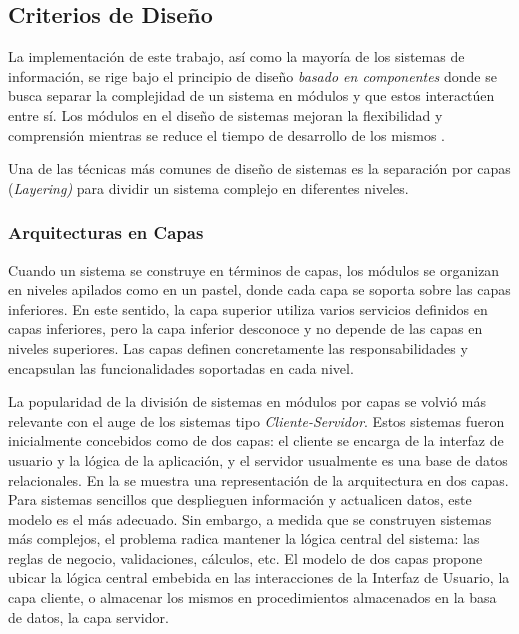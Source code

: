 \subsection{Criterios de Diseño}

\label{ssec52:criterios-dise=0000F1o}La implementación de este trabajo,
así como la mayoría de los sistemas de información, se rige bajo el
principio de diseño \emph{basado en componentes} donde se busca separar
la complejidad de un sistema en módulos y que estos interactúen entre
sí. Los módulos en el diseño de sistemas mejoran la flexibilidad y
comprensión mientras se reduce el tiempo de desarrollo de los mismos
\cite{Parnas1972}.

Una de las técnicas más comunes de diseño de sistemas\emph{ }es la
separación por capas (\emph{Layering)} para dividir un sistema complejo
\cite{Fowler2002} en diferentes niveles. 

\subsubsection{Arquitecturas en Capas}

Cuando un sistema se construye en términos de capas, los módulos se
organizan en niveles apilados como en un pastel, donde cada capa se
soporta sobre las capas inferiores. En este sentido, la capa superior
utiliza varios servicios definidos en capas inferiores, pero la capa
inferior desconoce y no depende de las capas en niveles superiores.
Las capas definen concretamente las responsabilidades y encapsulan
las funcionalidades soportadas en cada nivel.

La popularidad de la división de sistemas en módulos por capas se
volvió más relevante con el auge de los sistemas tipo \emph{Cliente-Servidor}.
Estos sistemas fueron inicialmente concebidos como de dos capas: el
cliente se encarga de la interfaz de usuario y la lógica de la aplicación,
y el servidor usualmente es una base de datos relacionales. En la
 se muestra una representación de la
arquitectura en dos capas. Para sistemas sencillos que desplieguen
información y actualicen datos, este modelo es el más adecuado. Sin
embargo, a medida que se construyen sistemas más complejos, el problema
radica mantener la lógica central del sistema: las reglas de negocio,
validaciones, cálculos, etc. El modelo de dos capas propone ubicar
la lógica central embebida en las interacciones de la Interfaz de
Usuario, la capa cliente, o almacenar los mismos en procedimientos
almacenados en la basa de datos, la capa servidor.

